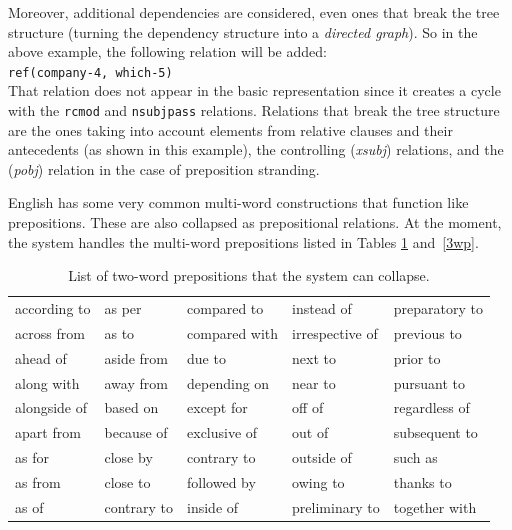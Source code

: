 \documentclass[11pt,letterpaper]{article}
\begin{document}
\bigskip

\noindent Moreover, additional dependencies are considered, even ones that break the tree structure (turning the dependency structure into a \emph{directed graph}). So in the above example, the following relation will be added:\\
\indent \texttt{ref(company-4, which-5)}\\
That relation does not appear in the basic representation since it creates a cycle with the \texttt{rcmod} and \texttt{nsubjpass} relations. Relations that break the tree structure are the ones taking into account elements from relative clauses and their antecedents (as shown in this example), the controlling (\emph{xsubj}) relations, and the (\emph{pobj}) relation in the case of preposition stranding.

\bigskip

English has some very common multi-word constructions that function like prepositions.  These are also collapsed as prepositional relations. At the moment, the system  handles the multi-word prepositions listed in Tables \ref{2wp} and~\ref{3wp}.


\begin{table}
\begin{center}
\begin{tabular}{lllll}\hline
according to & as per & compared to & instead of & preparatory to  \\
across from & as to &  compared with & irrespective of & previous to  \\
ahead of & aside from & due to & next to & prior to \\
along with & away from & depending on & near to & pursuant to \\
alongside of & based on & except for & off of & regardless of \\
apart from & because of & exclusive of  & out of & subsequent to \\
as for & close by & contrary to & outside of & such as \\
as from & close to & followed by & owing to & thanks to \\
as of & contrary to & inside of & preliminary to & together with\\ \hline
\end{tabular}
\caption{List of two-word prepositions that the system can collapse.}\label{2wp}
\end{center}
\end{table}

\bigskip
\end{document}
